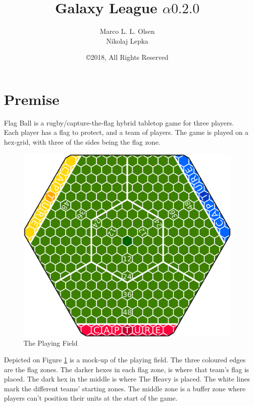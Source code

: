 \documentclass{book}
\title{Galaxy League $\alpha0.2.0$}
\author{Marco L. L. Olsen\\ Nikolaj Lepka}
\date{\copyright 2018, All Rights Reserved}
\begin{document}
\maketitle

\section*{Premise}
Flag Ball is a rugby/capture-the-flag hybrid tabletop game for three players.
Each player has a flag to protect, and a team of players.
The game is played on a hex-grid, with three of the sides being the flag zone.
\begin{figure}
    \centering
    \includegraphics[width=\textwidth]{board-2}
    \caption{The Playing Field}
    \label{fig:court}
\end{figure}
Depicted on Figure \ref{fig:court} is a mock-up of the playing field. The three coloured edges are the flag zones. The darker hexes in each flag zone, is where that team's flag is placed. 
The dark hex in the middle is where The Heavy is placed.
The white lines mark the different teams' starting zones. The middle zone is a buffer zone where players can’t position their units at the start of the game.

\tableofcontents




\end{document}
